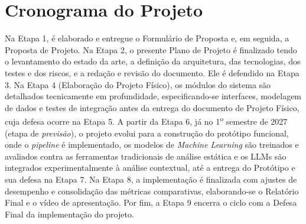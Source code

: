 \chapter{Cronograma do Projeto}
\label{cap:cronograma}


Na Etapa 1, é elaborado e entregue o Formulário de Proposta e, em
seguida, a Proposta de Projeto. Na Etapa 2, o presente Plano de Projeto
é finalizado tendo o levantamento do estado da arte, a definição da
arquitetura, das tecnologias, dos testes e dos riscos, e a redação e
revisão do documento. Ele é defendido na Etapa 3. Na Etapa 4 (Elaboração do Projeto Físico), os módulos
do sistema são detalhados tecnicamente em profundidade, especificando-se
interfaces, modelagem de dados e testes de integração antes da entrega do
documento de Projeto Físico, cuja defesa ocorre na Etapa 5. A partir da Etapa 6, já no
1\textsuperscript{o} semestre de 2027 (etapa de \textit{previsão}), o
projeto evolui para a construção do protótipo funcional, onde o \textit{pipeline} é implementado, os modelos de \textit{Machine Learning} são treinados e avaliados contra as ferramentas tradicionais de análise estática e os LLMs são integrados experimentalmente à análise contextual, até a entrega do Protótipo e sua defesa na Etapa 7. Na Etapa 8, a
implementação é finalizada com ajustes de desempenho e consolidação das métricas comparativas, elaborando-se o Relatório Final e o vídeo de apresentação. Por fim, a Etapa 9 encerra o ciclo com a Defesa Final da implementação do projeto.

